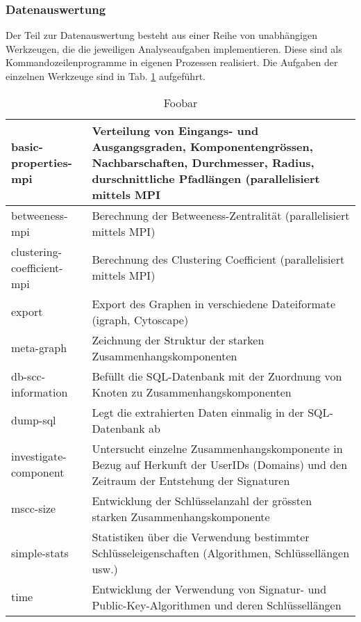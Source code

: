 \subsubsection{Datenauswertung}
\label{sec:datenauswertung}

Der Teil zur Datenauswertung besteht aus einer Reihe von unabhängigen
Werkzeugen, die die jeweiligen Analyseaufgaben implementieren. Diese
sind als Kommandozeilenprogramme in eigenen Prozessen realisiert. Die
Aufgaben der einzelnen Werkzeuge sind in Tab. \ref{tab:tools}
aufgeführt.

\begin{table}

  \begin{tabular}[h]{|l|p{9cm}|}
    \hline
    basic-properties-mpi & Verteilung von Eingangs- und Ausgangsgraden,
    Komponentengrössen, Nachbarschaften, Durchmesser, Radius,
    durschnittliche Pfadlängen (parallelisiert mittels
    MPI\\
    \hline
    betweeness-mpi & Berechnung der Betweeness-Zentralität
    (parallelisiert mittels MPI) \\
    \hline
    clustering-coefficient-mpi & Berechnung des Clustering Coefficient
    (parallelisiert mittels MPI) \\
    \hline
    export & Export des Graphen in verschiedene Dateiformate (igraph,
    Cytoscape) \\
    \hline
    meta-graph & Zeichnung der Struktur der starken
    Zusammenhangskomponenten \\
    \hline
    db-scc-information & Befüllt die SQL-Datenbank mit der Zuordnung
    von Knoten zu Zusammenhangskomponenten \\
    \hline
    dump-sql & Legt die extrahierten Daten einmalig in der
    SQL-Datenbank ab \\
    \hline 
    investigate-component & Untersucht einzelne
    Zusammenhangskomponente in Bezug auf Herkunft der UserIDs
    (Domains) und den Zeitraum der Entstehung der Signaturen \\
    \hline
    mscc-size & Entwicklung der Schlüsselanzahl der grössten starken
    Zusammenhangskomponente \\
    \hline
    simple-stats & Statistiken über die Verwendung bestimmter
    Schlüsseleigenschaften (Algorithmen, Schlüssellängen usw.) \\
    time & Entwicklung der Verwendung von Signatur- und
    Public-Key-Algorithmen und deren Schlüssellängen\\
    \hline
  \end{tabular}
  \caption{Foobar}
  \label{tab:tools}
\end{table}

